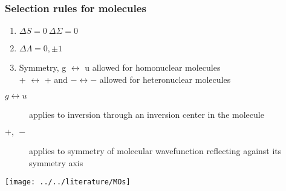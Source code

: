 \documentclass[a4paper,titlepage]{article}
\begin{document}
\begin{frame}
\frametitle{Selection rules for molecules}
\begin{enumerate}
\item \(\Delta S = 0 \ \Delta\Sigma = 0\)
\item \(\Delta\Lambda = 0, \pm1\)
\item Symmetry, g \(\leftrightarrow\) u allowed for homonuclear molecules\\
	+ \(\leftrightarrow\) + and \(- \leftrightarrow -\) allowed for heteronuclear molecules
\end{enumerate}
\bigskip
\begin{description}
\item[\(g \leftrightarrow u \)] applies to inversion through an inversion center in the molecule\newline
\item[\(+,\ -\)] applies to symmetry of molecular wavefunction reflecting against its symmetry axis
\end{description}
\end{frame}

%
%

\texttt{[image: ../../literature/MOs]}



%
\end{document}
